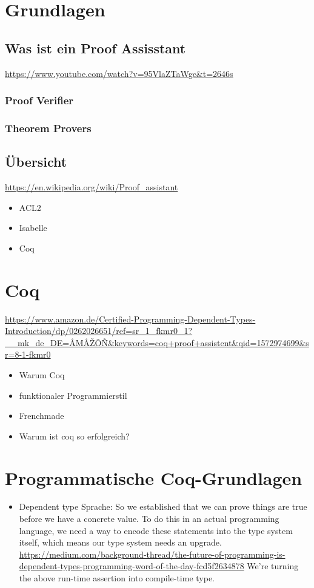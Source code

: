 \section{Grundlagen}
\subsection{Was ist ein Proof Assisstant}
\url{https://www.youtube.com/watch?v=95VlaZTaWgc&t=2646s}


\subsubsection{Proof Verifier}
\subsubsection{Theorem Provers}

\subsection{Übersicht}
\url{https://en.wikipedia.org/wiki/Proof_assistant}
\begin{itemize}
	\item ACL2
	\item Isabelle
	\item Coq
\end{itemize}

\section{Coq}
\url{https://www.amazon.de/Certified-Programming-Dependent-Types-Introduction/dp/0262026651/ref=sr_1_fkmr0_1?__mk_de_DE=ÅMÅŽÕÑ&keywords=coq+proof+assistent&qid=1572974699&sr=8-1-fkmr0}
\begin{itemize}
	\item Warum Coq
	\item funktionaler Programmierstil
	\item Frenchmade
	\item Warum ist coq so erfolgreich?
\end{itemize}

\section{Programmatische Coq-Grundlagen}
\begin{itemize}
	\item Dependent type Sprache: So we established that we can prove things are true before we have a concrete value. To do this in an actual programming language, we need a way to encode these statements into the type system itself, which means our type system needs an upgrade. \url{https://medium.com/background-thread/the-future-of-programming-is-dependent-types-programming-word-of-the-day-fcd5f2634878}
	We're turning the above run-time assertion into compile-time type.
\end{itemize}
